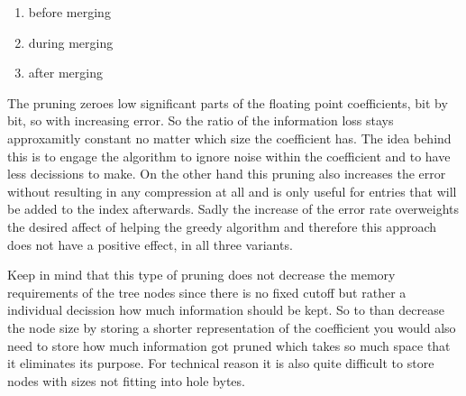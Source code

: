 \begin{enumerate}
    \item before merging
    \item during merging
    \item after merging
\end{enumerate}

The pruning zeroes low significant parts of the floating point coefficients, bit by bit, so with increasing error. So the ratio of the information loss stays approxamitly constant no matter which size the coefficient has. The idea behind this is to engage the algorithm to ignore noise within the coefficient and to have less decissions to make. On the other hand this pruning also increases the error without resulting in any compression at all and is only useful for entries that will be added to the index afterwards. Sadly the increase of the error rate overweights the desired affect of helping the greedy algorithm and therefore this approach does not have a positive effect, in all three variants.

Keep in mind that this type of pruning does not decrease the memory requirements of the tree nodes since there is no fixed cutoff but rather a individual decission how much information should be kept. So to than decrease the node size by storing a shorter representation of the coefficient you would also need to store how much information got pruned which takes so much space that it eliminates its purpose. For technical reason it is also quite difficult to store nodes with sizes not fitting into hole bytes.
